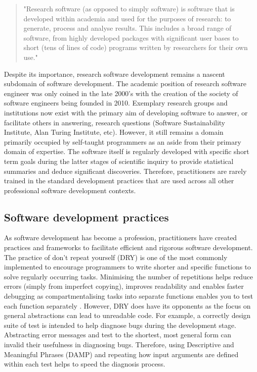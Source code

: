 \documentclass[../main.tex]{subfiles}
\begin{document}
\begin{quote}
"Research software (as opposed to simply software) is software that is developed within academia and used for the purposes of research: to generate, process and analyse results.
This includes a broad range of software, from highly developed packages with significant user bases to short (tens of lines of code) programs written by researchers for their own use."
\end{quote}

Despite its importance, research software development remains a nascent subdomain of software development. 
The academic position of research software engineer was only coined in the late 2000's \cite{Prause2010} with the creation of the society of software engineers being founded in 2010. 
Exemplary research groups and institutions now exist with the primary aim of developing software to answer, or facilitate others in answering, research questions (Software Sustainability Institute, Alan Turing Institute, etc). 
However, it still remains a domain primarily occupied by self-taught programmers as an aside from their primary domain of expertise. 
The software itself is regularly developed with specific short term goals during the latter stages of scientific inquiry to provide statistical summaries and deduce significant discoveries. 
Therefore, practitioners are rarely trained in the standard development practices that are used across all other professional software development contexts.

\subsection{Software development practices}


As software development has become a profession, practitioners have created practices and frameworks to facilitate efficient and rigorous software development.
The practice of don't repeat yourself (DRY) is one of the most commonly implemented to encourage programmers to write shorter and specific functions to solve regularly occurring tasks. 
Minimising the number of repetitions helps reduce errors (simply from imperfect copying), improves readability and enables faster debugging as compartmentalising tasks into separate functions enables you to test each function separately \parencite{Thomas1999}.
However, DRY does have its opponents as the focus on general abstractions can lead to unreadable code.
For example, a correctly design suite of test is intended to help diagnose bugs during the development stage.
Abstracting error messages and test to the shortest, most general form can invalid their usefulness in diagnosing bugs.
Therefore, using Descriptive and Meaningful Phrases (DAMP) and repeating how input arguments are defined within each test helps to speed the diagnosis process.
\end{document}
